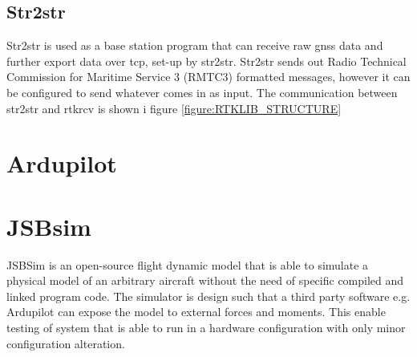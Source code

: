 \subsection{Str2str}
Str2str is used as a base station program that can receive raw \gls{gnss} data and further export data over tcp, set-up by str2str. Str2str sends out Radio Technical Commission for Maritime Service 3 (RMTC3) formatted messages, however it can be configured to send whatever comes in as input. The communication between str2str and rtkrcv is shown i figure \ref{figure:RTKLIB_STRUCTURE}
\section{Ardupilot}

\section{JSBsim}
JSBSim \citep{berndt2004jsbsim} is an open-source flight dynamic model that is able to simulate a physical model of an arbitrary aircraft without the need of specific compiled and linked program code. The simulator is design such that a third party software e.g. Ardupilot can expose the model to external forces and moments. This enable  testing of system that is able to run in a hardware configuration with only minor configuration alteration.
\cleardoublepage